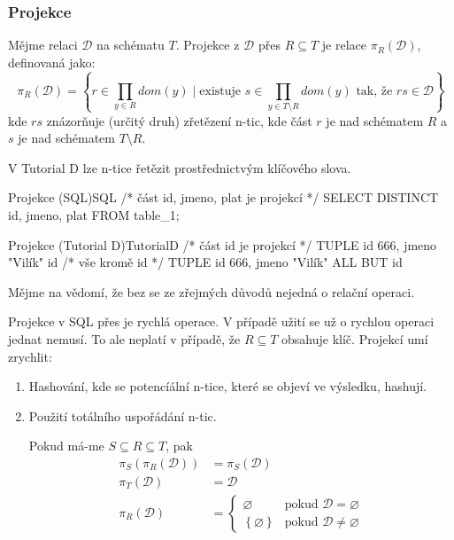 \subsubsection{Projekce}
Mějme relaci $\mathcal{D}$ na schématu $T$. Projekce z $\mathcal{D}$ přes $R \subseteq T$ je relace $\pi_{R}(\mathcal{D})$, definovaná jako:
$$
\pi_{R}(\mathcal{D}) = \left\{ r \in \prod_{y \in R} dom(y) \; | \; \text{existuje } s \in \prod_{y \in T \setminus R} dom(y) \text{ tak, že } rs \in \mathcal{D} \right\}
$$
kde $rs$ znázorňuje (určitý druh) zřetězení n-tic, kde část $r$ je nad schématem $R$ a $s$ je nad schématem $ T \setminus R$.

V Tutorial D lze n-tice řetězit prostřednictvým klíčového slova.
\begin{upcode}{Projekce (SQL)}{}{SQL}
/* část id, jmeno, plat je projekcí */
SELECT DISTINCT id, jmeno, plat FROM table_1;
\end{upcode}
\begin{upcode}{Projekce (Tutorial D)}{}{TutorialD}
/* část {id} je projekcí */
TUPLE {id 666, jmeno "Vilík"} {id}
/* vše kromě id */
TUPLE {id 666, jmeno "Vilík"} {ALL BUT id}
\end{upcode}
Mějme na vědomí, že bez se ze zřejmých důvodů nejedná o relační operaci.

Projekce v SQL přes je rychlá operace. V případě užití se už o rychlou operaci jednat nemusí. To ale neplatí v případě, že $R \subseteq T$ obsahuje klíč. Projekcí umí zrychlit:
\begin{enumerate}
\item Hashování, kde se potencíální n-tice, které se objeví ve výsledku, hashují.
\item Použití totálního uspořádání n-tic.
\begin{upquote}
Pokud má-me $S \subseteq R \subseteq T$, pak
\begin{align*}
\pi_{S} (\pi_{R}(\mathcal{D})) &= \pi_{S}(\mathcal{D}) \\
\pi_{T} (\mathcal{D}) &= \mathcal{D} \\
\pi_{R} (\mathcal{D}) &=\left\{\!\!\!
\begin{array}{ll}
\varnothing & \text{pokud } \mathcal{D} = \varnothing \\
\left\{ \varnothing \right\} & \text{pokud } \mathcal{D} \neq \varnothing
\end{array}\right.
\end{align*}
\end{upquote}
\end{enumerate}

